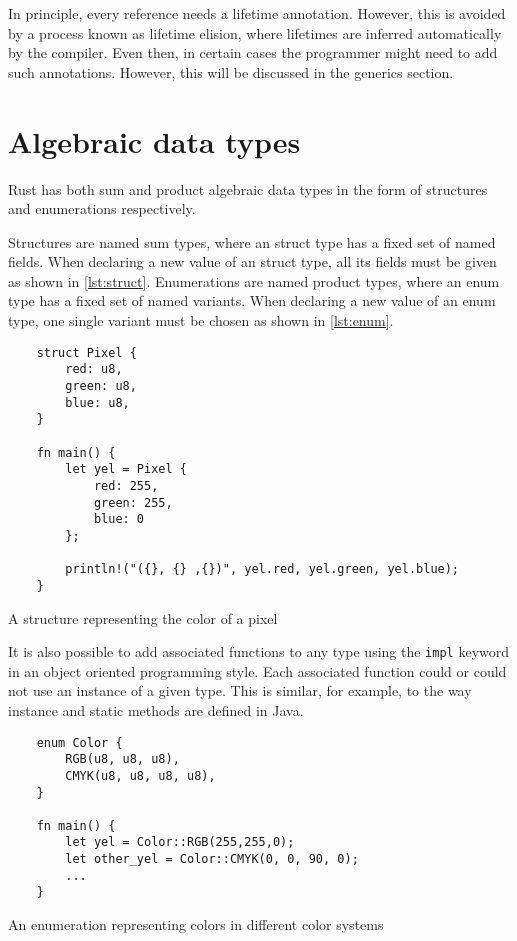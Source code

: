 In principle, every reference needs a lifetime annotation. However, this is avoided by a process known as lifetime elision, where lifetimes are inferred automatically by the compiler. Even then, in certain cases the programmer might need to add such annotations. However, this will be discussed in the generics section.

\section{Algebraic data types}
Rust has both sum and product algebraic data types in the form of structures and enumerations respectively.

Structures are named sum types, where an struct type has a fixed set of named
fields. When declaring a new value of an struct type, all its fields must be
given as shown in \ref{lst:struct}. Enumerations are named product types, where
an enum type has a fixed set of named variants. When declaring a new value of an
enum type, one single variant must be chosen as shown in \ref{lst:enum}.

\begin{listing}[ht]
	\begin{verbatim}
    struct Pixel {
        red: u8,
        green: u8,
        blue: u8,
    }

    fn main() {
        let yel = Pixel {
            red: 255,
            green: 255,
            blue: 0
        };

        println!("({}, {} ,{})", yel.red, yel.green, yel.blue);
    }
    \end{verbatim}
  \caption{A structure representing the color of a pixel}
  \label{lst:struct}
\end{listing}

It is also possible to add associated functions to any type using the \texttt{impl} keyword in an object oriented programming style. Each associated function could or could not use an instance of a given type. This is similar, for example, to the way instance and static methods are defined in Java.

\begin{listing}[ht]
	\begin{verbatim}
    enum Color {
        RGB(u8, u8, u8),
        CMYK(u8, u8, u8, u8),
    }

    fn main() {
        let yel = Color::RGB(255,255,0);
        let other_yel = Color::CMYK(0, 0, 90, 0);
        ...
    }
    \end{verbatim}
  \caption{An enumeration representing colors in different color systems}
  \label{lst:enum}
\end{listing}

